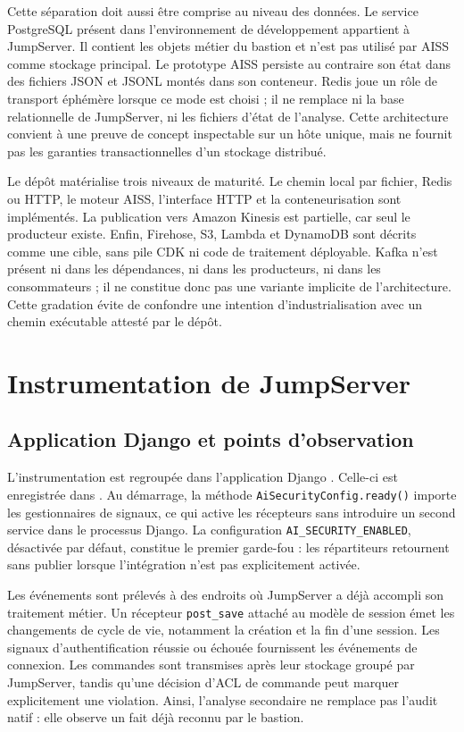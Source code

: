 \documentclass[11pt,a4paper,oneside]{report}
\theoremstyle{definition}
\theoremstyle{plain}
\begin{document}
Cette séparation doit aussi être comprise au niveau des données. Le service
PostgreSQL présent dans l'environnement de développement appartient à
JumpServer. Il contient les objets métier du bastion et n'est pas utilisé par
AISS comme stockage principal. Le prototype AISS persiste au contraire son
état dans des fichiers JSON et JSONL montés dans son conteneur. Redis joue un
rôle de transport éphémère lorsque ce mode est choisi ; il ne remplace ni la
base relationnelle de JumpServer, ni les fichiers d'état de l'analyse. Cette
architecture convient à une preuve de concept inspectable sur un hôte unique,
mais ne fournit pas les garanties transactionnelles d'un stockage distribué.

Le dépôt matérialise trois niveaux de maturité. Le chemin local par fichier,
Redis ou HTTP, le moteur AISS, l'interface HTTP et la conteneurisation sont
implémentés. La publication vers Amazon Kinesis est partielle, car seul le
producteur existe. Enfin, Firehose, S3, Lambda et DynamoDB sont décrits comme
une cible, sans pile CDK ni code de traitement déployable. Kafka n'est présent
ni dans les dépendances, ni dans les producteurs, ni dans les consommateurs ;
il ne constitue donc pas une variante implicite de l'architecture. Cette
gradation évite de confondre une intention d'industrialisation avec un chemin
exécutable attesté par le dépôt.

\section{Instrumentation de JumpServer}

\subsection{Application Django et points d'observation}

L'instrumentation est regroupée dans l'application Django
. Celle-ci est enregistrée dans
. Au démarrage, la méthode
\texttt{AiSecurityConfig.ready()} importe les gestionnaires de signaux, ce qui
active les récepteurs sans introduire un second service dans le processus
Django. La configuration \texttt{AI\_SECURITY\_ENABLED}, désactivée par
défaut, constitue le premier garde-fou : les répartiteurs retournent sans
publier lorsque l'intégration n'est pas explicitement activée.

Les événements sont prélevés à des endroits où JumpServer a déjà accompli son
traitement métier. Un récepteur \texttt{post\_save} attaché au modèle de
session émet les changements de cycle de vie, notamment la création et la fin
d'une session. Les signaux d'authentification réussie ou échouée fournissent
les événements de connexion. Les commandes sont transmises après leur
stockage groupé par JumpServer, tandis qu'une décision d'ACL de commande peut
marquer explicitement une violation. Ainsi, l'analyse secondaire ne remplace
pas l'audit natif : elle observe un fait déjà reconnu par le bastion.
\end{document}
